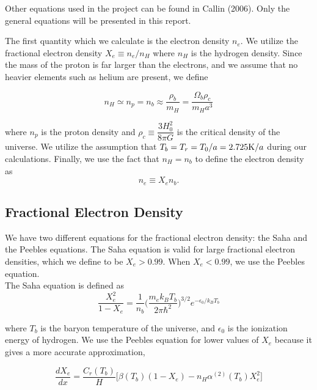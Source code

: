 \documentclass[twoside]{article}
\begin{document}
Other equations used in the project can be found in Callin (2006). Only the general equations will be presented in this report.

The first quantity which we calculate is the electron density $n_e$. We utilize the fractional electron density $X_e \equiv n_e/n_H$ where $n_H$ is the hydrogen density. Since the mass of the proton is far larger than the electrons, and we assume that no heavier elements such as helium are present, we define 

\begin{equation}
n_H \simeq n_p = n_b \approx \dfrac{\rho_b}{m_H} = \dfrac{\Omega_b \rho_c}{m_Ha^3}
\end{equation}

\noindent where $n_p$ is the proton density and $\rho_c \equiv \dfrac{3 H_0^2}{8 \pi G}$ is the critical density of the universe. We utilize the assumption that $T_b = T_r = T_0/a = 2.725{\rm K}/a$ during our \mbox{calculations}. Finally, we use the fact that $n_H = n_b$ to define the electron density as
\begin{equation}\label{eq:elecdense}
n_e \equiv X_e n_b.
\end{equation}

\subsection{Fractional Electron Density}\label{sec:elecfrac}
We have two different equations for the fractional electron density: the Saha and the Peebles equations. The Saha equation is valid for large fractional electron densities, which we define to be $X_e > 0.99$. When $X_e < 0.99$, we use the Peebles equation.\\

\noindent The Saha equation is defined as
\begin{equation}\label{eq:saha}
\dfrac{X_e^2}{1-X_e} = \dfrac{1}{n_b}\Big(\dfrac{m_ek_BT_b}{2\pi\hbar^2}\Big)^{3/2}e^{-\epsilon_0/k_BT_b}
\end{equation}

\noindent where $T_b$ is the baryon temperature of the universe, and $\epsilon_0$ is the ionization energy of hydrogen. We use the Peebles equation for lower values of $X_e$ because it gives a more accurate approximation,

\begin{equation}\label{eq:peeble}
\dfrac{dX_e}{dx} = \dfrac{C_r(T_b)}{H}\Big[\beta(T_b)(1-X_e) - n_H\alpha^{(2)}(T_b)X_e^2\Big]
\end{equation}
\end{document}
